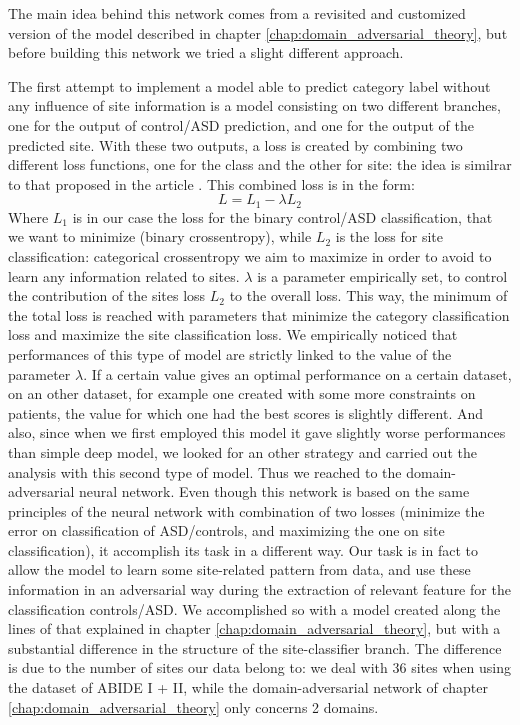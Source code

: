 \documentclass[11pt]{report}
\begin{document}
The main idea behind this network comes from a revisited and customized version of the model described in chapter \ref{chap:domain_adversarial_theory}, but before building this network we tried a slight different approach.

The first attempt to implement a model able to predict category label without any influence of site information is a model consisting on two different branches, one for the output of control/ASD prediction, and one for the output of the predicted site.
With these two outputs, a loss is created by combining two different loss functions, one for the class and the other for site: the idea is similrar to that proposed in the article \cite{guan2021}.
This combined loss is in the form:
\begin{equation}
L = L_1 - \lambda L_2
\end{equation}
Where $L_1$  is in our case the loss for the binary control/ASD classification, that we want to minimize (binary crossentropy), while $L_2$ is the loss for site classification: categorical crossentropy we aim to maximize in order to avoid to learn any information related to sites.
$\lambda $ is a parameter empirically set, to control the contribution of the sites loss $L_2$ to the overall loss.
This way, the minimum of the total loss is reached with parameters that minimize the category classification loss and maximize the site classification loss.
We empirically noticed that performances of this type of model are strictly linked to the value of the parameter $\lambda$.
If a certain value gives an optimal performance on a certain dataset, on an other dataset, for example one created with some more constraints on patients, the value for which one had the best scores is slightly different.
And also, since when we first employed this model it gave slightly worse performances than simple deep model, we looked for an other strategy and carried out the analysis with this second type of model.
Thus we reached to the domain-adversarial neural network.
Even though this network is based on the same principles of the neural network with combination of two losses (minimize the error on classification of ASD/controls, and maximizing the one on site classification), it accomplish its task in a different way.
Our task is in fact to allow the model to learn some site-related pattern from data, and use these information in an adversarial way during the extraction of relevant feature for the classification controls/ASD.
We accomplished so with a model created along the lines of that explained in chapter \ref{chap:domain_adversarial_theory}, but with a substantial difference in the structure of the site-classifier branch.
The difference is due to the number of sites our data belong to: we deal with 36 sites when using the dataset of ABIDE I + II, while the domain-adversarial network of chapter \ref{chap:domain_adversarial_theory} only concerns 2 domains.
\end{document}
